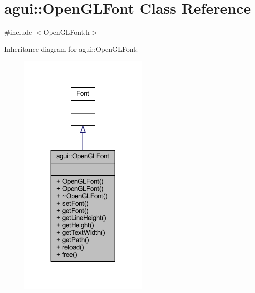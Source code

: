 \hypertarget{classagui_1_1_open_g_l_font}{}\section{agui\+:\+:Open\+G\+L\+Font Class Reference}
\label{classagui_1_1_open_g_l_font}


{\ttfamily \#include $<$Open\+G\+L\+Font.\+h$>$}



Inheritance diagram for agui\+:\+:Open\+G\+L\+Font\+:
\nopagebreak
\begin{figure}[H]
\begin{center}
\leavevmode
\includegraphics[width=176pt]{classagui_1_1_open_g_l_font__inherit__graph}
\end{center}
\end{figure}


